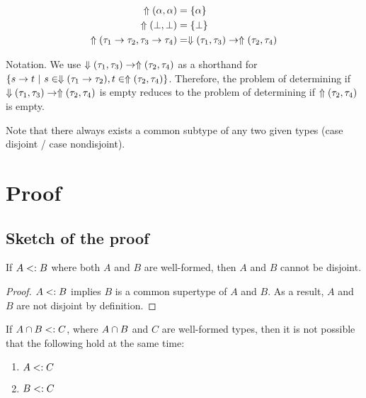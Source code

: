 \documentclass[preprint]{sigplanconf}
\begin{document}
\begin{align*}
  \Uparrow(\alpha,\alpha) &= \{ \alpha \} \\
  \Uparrow(\bot,\bot) &= \{ \bot \} \\
  \Uparrow(\tau_1 \to \tau_2, \tau_3 \to \tau_4) &= \Downarrow(\tau_1,\tau_3) \to \Uparrow(\tau_2,\tau_4) \\
\end{align*}

Notation. We use $\Downarrow(\tau_1,\tau_3) \to \Uparrow(\tau_2,\tau_4)$ as a shorthand for $\{ s \to t ~|~ s \in \Downarrow(\tau_1 \to \tau_2), t \in \Uparrow(\tau_2,\tau_4) \}$. Therefore, the problem of determining if $\Downarrow(\tau_1,\tau_3) \to \Uparrow(\tau_2,\tau_4)$ is empty reduces to the problem of determining if $\Uparrow(\tau_2,\tau_4)$ is empty.

Note that there always exists a common subtype of any two given types (case disjoint / case nondisjoint).

\section{Proof}

\subsection{Sketch of the proof}

\begin{lemma}
If $A <: B$ where both $A$ and $B$ are well-formed, then $A$ and $B$ cannot be disjoint.
\end{lemma}

\begin{proof}
$A <: B$ implies $B$ is a common supertype of $A$ and $B$. As a result, $A$ and $B$ are not disjoint by definition.
\end{proof}

\begin{lemma} \label{unique-subtype-contributor}
If $A \cap B <: C$, where $A \cap B$ and $C$ are well-formed types, then it is not possible that the following hold at the same time:
\begin{enumerate}
\item $A <: C$
\item $B <: C$
\end{enumerate}
\end{lemma}
\end{document}
